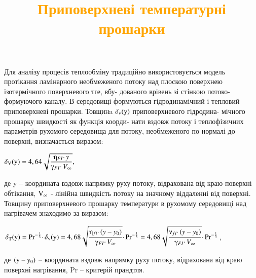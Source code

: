 \documentclass[aspectratio=169]{beamer}
\begin{document}
{
\title{\textcolor{orange}{Приповерхневі температурні прошарки}}
\begin{frame}
Для аналізу процесів теплообміну традиційно використовується модель протікання ламінарного необмеженого потоку над плоскою поверхнею ізотермічного поверхневого тге, вбу- дованого врівень зі стінкою потоко-формуючого каналу. В середовищі формуються гідродинамічний і тепловий приповерхневі прошарки. Товщинa $\rm \delta_{v}(y)$ приповерхневого гідродина- мічного прошарку швидкості як функція коорди- нати вздовж потоку і теплофізичних параметрів рухомого середовища для потоку, необмеженого по нормалі до поверхні, визначається виразом:\\
\begin{center}
\small{$\displaystyle \rm \delta_{V}(y)=4,64\sqrt{\frac{\etaup_{FI}\cdotp y}		{\gammaup_{FI}\cdotp V_{\infty}}},$}\\
\end{center}
{
де y – координата вздовж напрямку руху потоку, відрахована від краю поверхні обтікання, {$\displaystyle\rm V_{\infty}$} - лінійна швидкість потоку на значному віддаленні від поверхні. 
}
Товщину приповерхневого прошарку температури в рухомому середовищі над нагрівачем знаходимо за виразом:\\
\begin{center}
\normalsize{$\displaystyle\rm \delta_{T}(y)=Pr^{-\frac{1}{3}}\cdotp \delta_{v}(y) = 4,68\sqrt{   \frac{\etaup_{fl}\cdotp (y-y_{0})}     {\gammaup_{FI}\cdotp V_{\infty}} } \cdotp Pr^{-\frac{1}{3}}  = 
4,68\sqrt{   \frac{\nuup_{fl}\cdotp (y-y_{0})}     {\gammaup_{FI}\cdotp V_{\infty}} } \cdotp Pr^{-\frac{1}{3}}  $},\\
\end{center}
де ${\rm(y-y_{0})}$ – координата вздовж напрямку руху потоку, відрахована від краю поверхні нагрівання, Pr – критерій прандтля.
\end{frame}
}
\end{document}

